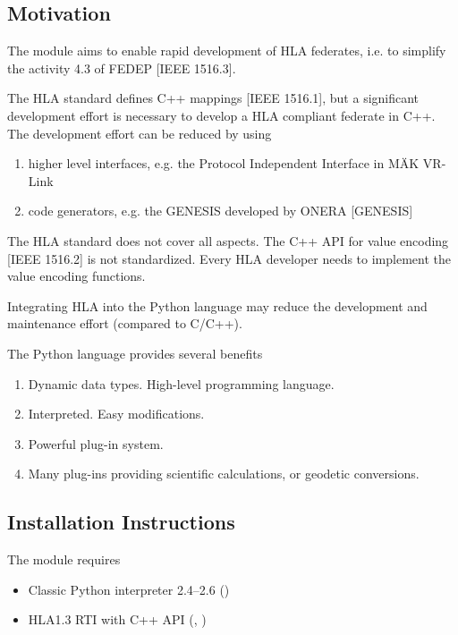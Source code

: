 \documentclass[12pt,a4paper]{howto}
\begin{document}
\subsection{Motivation}

The  module aims to enable rapid development of HLA federates,
i.e. to simplify the activity 4.3 of FEDEP [IEEE 1516.3].

The HLA standard defines C++ mappings [IEEE 1516.1], but a significant
development effort is necessary to develop a HLA compliant federate in C++.
The development effort can be reduced by using
\begin{enumerate}
\item higher level interfaces, e.g. the Protocol Independent Interface in M\"{A}K VR-Link
\item code generators, e.g. the GENESIS developed by ONERA [GENESIS]
\end{enumerate}

The HLA standard does not cover all aspects.
The C++ API for value encoding [IEEE 1516.2] is not standardized. Every HLA
developer needs to implement the value encoding functions.

Integrating HLA into the Python language may reduce the development and
maintenance effort (compared to C/C++).

The Python language provides several benefits
\begin{enumerate}
\item Dynamic data types. High-level programming language.
\item Interpreted. Easy modifications.
\item Powerful plug-in system.
\item Many plug-ins providing scientific calculations, or geodetic conversions.
\end{enumerate}

\subsection{Installation Instructions}

The  module requires
\begin{itemize}
\item Classic Python interpreter 2.4--2.6 ()
\item HLA1.3 RTI with C++ API (, )
\end{itemize}
\end{document}
